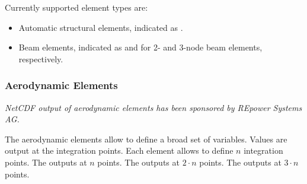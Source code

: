 Currently supported element types are:
\begin{itemize}
\item Automatic structural elements, indicated as .
\item Beam elements, indicated as  and 
for 2- and 3-node beam elements, respectively.
\end{itemize}


\subsubsection{Aerodynamic Elements}
\label{sec:NetCDF:Elem:Aerodynamic}
\emph{NetCDF output of aerodynamic elements has been sponsored
by REpower Systems AG.}

The aerodynamic elements allow to define a broad set of variables.
Values are output at the integration points.
Each element allows to define $n$ integration points.
The  outputs at $n$ points.
The  outputs at $2 \cdot n$ points.
The  outputs at $3 \cdot n$ points.

